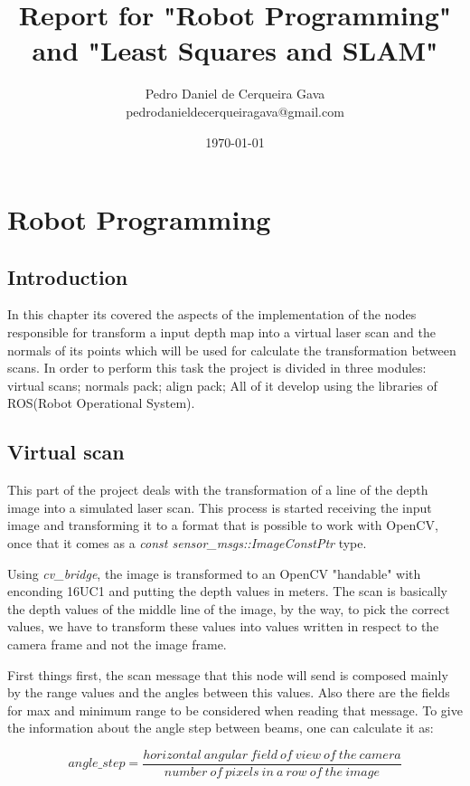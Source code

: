 \documentclass[10pt,a4paper,final]{report}
\author{Pedro Daniel de Cerqueira Gava \\ pedrodanieldecerqueiragava@gmail.com}
\title{Report for "Robot Programming" and "Least Squares and SLAM"}
\date{\today}
\begin{document}
\maketitle

\chapter{Robot Programming}

\section{Introduction}

In this chapter its covered the aspects of the implementation of the nodes responsible for transform a input depth map into a virtual laser scan and the normals of its points which will be used for calculate the transformation between scans. In order to perform this task the project is divided in three modules: virtual scans; normals pack; align pack; All of it develop using the libraries of ROS(Robot Operational System).

\section{Virtual scan}

This part of the project deals with the transformation of a line of the depth image into a simulated laser scan. This process is started receiving the input image and transforming it to a format that is possible to work 
with OpenCV, once that it comes as a \textit{const sensor\_msgs::ImageConstPtr } type.

Using \textit{cv\_bridge}, the image is transformed to an OpenCV "handable" with enconding 16UC1 and putting the depth values in meters. The scan is basically the depth values of the middle line of the image, by the way, to pick the correct values, we have to transform these values into values written in respect to the camera frame and not the image frame.

First things first, the scan message that this node will send is composed mainly by the range values and the angles between this values. Also there are the fields for max and minimum range to be considered when reading that message. To give the information about the angle step between beams, one can calculate it as:

\begin{equation}
angle\_step = \frac{horizontal \ angular \ field \ of \ view \ of \ the \ camera}{number \ of \ pixels \ in \ a \ row \ of \ the \ image}
\end{equation}
\end{document}
